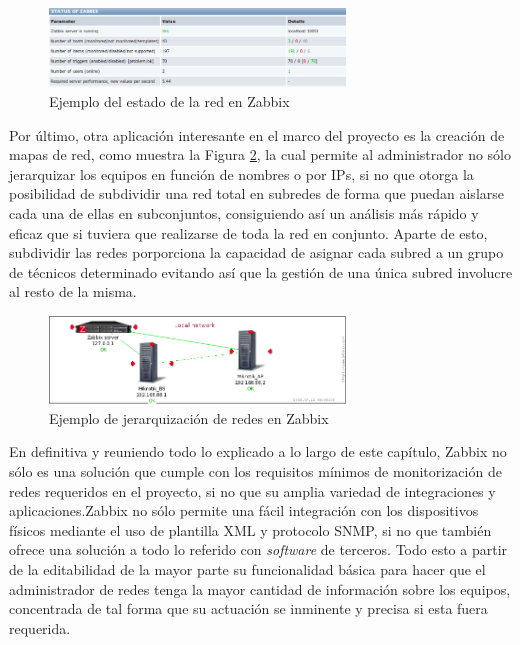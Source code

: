 \begin{figure}[H]
	\centering
	\includegraphics[width=0.7\textwidth]{img/zabbix_resume.png}
	\caption{Ejemplo del estado de la red en Zabbix}
	\label{zabbixResume}
\end{figure}

Por último, otra aplicación interesante en el marco del proyecto es la creación de mapas de red, como muestra la Figura \ref{zabbixNetwork}, la cual permite al administrador no sólo jerarquizar los equipos en función de nombres o por IPs, si no que otorga la posibilidad de subdividir una red total en subredes de forma que puedan aislarse cada una de ellas en subconjuntos, consiguiendo así un análisis más rápido y eficaz que si tuviera que realizarse de toda la red en conjunto. Aparte de esto, subdividir las redes porporciona la capacidad de asignar cada subred a un grupo de técnicos determinado evitando así que la gestión de una única subred involucre al resto de la misma.

\begin{figure}[H]
	\centering
	\includegraphics[width=0.7\textwidth]{img/zabbix_networks.png}
	\caption{Ejemplo de jerarquización de redes en Zabbix}
	\label{zabbixNetwork}
\end{figure}

En definitiva y reuniendo todo lo explicado a lo largo de este capítulo, Zabbix no sólo es una solución que cumple con los requisitos mínimos de monitorización de redes requeridos en el proyecto, si no que su amplia variedad de integraciones y aplicaciones.Zabbix no sólo permite una fácil integración con los dispositivos físicos mediante el uso de plantilla XML y protocolo SNMP, si no que también ofrece una solución a todo lo referido con \textit{software} de terceros. Todo esto a partir de la editabilidad de la mayor parte su funcionalidad básica para hacer que el administrador de redes tenga la mayor cantidad de información sobre los equipos, concentrada de tal forma que su actuación se inminente y precisa si esta fuera requerida.
